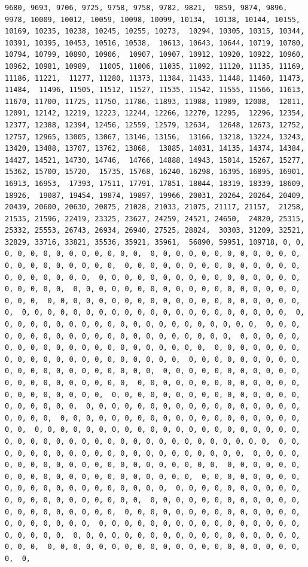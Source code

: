 \documentclass[
]{article}
\begin{document}
\begin{verbatim}
9680, 9693, 9706, 9725, 9758, 9758, 9782, 9821,  9859, 9874, 9896, 9978, 10009, 10012, 10059, 10098, 10099, 10134,  10138, 10144, 10155, 10169, 10235, 10238, 10245, 10255, 10273,  10294, 10305, 10315, 10344, 10391, 10395, 10453, 10516, 10538,  10613, 10643, 10644, 10719, 10780, 10794, 10799, 10890, 10906,  10907, 10907, 10912, 10920, 10922, 10960, 10962, 10981, 10989,  11005, 11006, 11035, 11092, 11120, 11135, 11169, 11186, 11221,  11277, 11280, 11373, 11384, 11433, 11448, 11460, 11473, 11484,  11496, 11505, 11512, 11527, 11535, 11542, 11555, 11566, 11613,  11670, 11700, 11725, 11750, 11786, 11893, 11988, 11989, 12008,  12011, 12091, 12142, 12219, 12223, 12244, 12266, 12270, 12295,  12296, 12354, 12377, 12388, 12394, 12456, 12559, 12579, 12634,  12648, 12673, 12752, 12757, 12965, 13005, 13067, 13146, 13156,  13166, 13218, 13224, 13243, 13420, 13488, 13707, 13762, 13868,  13885, 14031, 14135, 14374, 14384, 14427, 14521, 14730, 14746,  14766, 14888, 14943, 15014, 15267, 15277, 15362, 15700, 15720,  15735, 15768, 16240, 16298, 16395, 16895, 16901, 16913, 16953,  17393, 17511, 17791, 17851, 18044, 18319, 18339, 18609, 18926,  19087, 19454, 19874, 19897, 19966, 20031, 20264, 20264, 20409,  20439, 20600, 20630, 20875, 21028, 21033, 21075, 21117, 21157,  21258, 21535, 21596, 22419, 23325, 23627, 24259, 24521, 24650,  24820, 25315, 25332, 25553, 26743, 26934, 26940, 27525, 28824,  30303, 31209, 32521, 32829, 33716, 33821, 35536, 35921, 35961,  56890, 59951, 109718, 0, 0, 0, 0, 0, 0, 0, 0, 0, 0, 0, 0, 0,  0, 0, 0, 0, 0, 0, 0, 0, 0, 0, 0, 0, 0, 0, 0, 0, 0, 0, 0, 0, 0,  0, 0, 0, 0, 0, 0, 0, 0, 0, 0, 0, 0, 0, 0, 0, 0, 0, 0, 0, 0, 0,  0, 0, 0, 0, 0, 0, 0, 0, 0, 0, 0, 0, 0, 0, 0, 0, 0, 0, 0, 0, 0,  0, 0, 0, 0, 0, 0, 0, 0, 0, 0, 0, 0, 0, 0, 0, 0, 0, 0, 0, 0, 0,  0, 0, 0, 0, 0, 0, 0, 0, 0, 0, 0, 0, 0, 0, 0, 0, 0, 0, 0, 0, 0,  0, 0, 0, 0, 0, 0, 0, 0, 0, 0, 0, 0, 0, 0, 0, 0, 0, 0, 0, 0, 0,  0, 0, 0, 0, 0, 0, 0, 0, 0, 0, 0, 0, 0, 0, 0, 0, 0, 0, 0, 0, 0,  0, 0, 0, 0, 0, 0, 0, 0, 0, 0, 0, 0, 0, 0, 0, 0, 0, 0, 0, 0, 0,  0, 0, 0, 0, 0, 0, 0, 0, 0, 0, 0, 0, 0, 0, 0, 0, 0, 0, 0, 0, 0,  0, 0, 0, 0, 0, 0, 0, 0, 0, 0, 0, 0, 0, 0, 0, 0, 0, 0, 0, 0, 0,  0, 0, 0, 0, 0, 0, 0, 0, 0, 0, 0, 0, 0, 0, 0, 0, 0, 0, 0, 0, 0,  0, 0, 0, 0, 0, 0, 0, 0, 0, 0, 0, 0, 0, 0, 0, 0, 0, 0, 0, 0, 0,  0, 0, 0, 0, 0, 0, 0, 0, 0, 0, 0, 0, 0, 0, 0, 0, 0, 0, 0, 0, 0,  0, 0, 0, 0, 0, 0, 0, 0, 0, 0, 0, 0, 0, 0, 0, 0, 0, 0, 0, 0, 0,  0, 0, 0, 0, 0, 0, 0, 0, 0, 0, 0, 0, 0, 0, 0, 0, 0, 0, 0, 0, 0,  0, 0, 0, 0, 0, 0, 0, 0, 0, 0, 0, 0, 0, 0, 0, 0, 0, 0, 0, 0, 0,  0, 0, 0, 0, 0, 0, 0, 0, 0, 0, 0, 0, 0, 0, 0, 0, 0, 0, 0, 0, 0,  0, 0, 0, 0, 0, 0, 0, 0, 0, 0, 0, 0, 0, 0, 0, 0, 0, 0, 0, 0, 0,  0, 0, 0, 0, 0, 0, 0, 0, 0, 0, 0, 0, 0, 0, 0, 0, 0, 0, 0, 0, 0,  0, 0, 0, 0, 0, 0, 0, 0, 0, 0, 0, 0, 0, 0, 0, 0, 0, 0, 0, 0, 0,  0, 0, 0, 0, 0, 0, 0, 0, 0, 0, 0, 0, 0, 0, 0, 0, 0, 0, 0, 0, 0,  0, 0, 0, 0, 0, 0, 0, 0, 0, 0, 0, 0, 0, 0, 0, 0, 0, 0, 0, 0, 0,  0, 0, 0, 0, 0, 0, 0, 0, 0, 0, 0, 0, 0, 0, 0, 0, 0, 0, 0, 0, 0,  0, 0, 0, 0, 0, 0, 0, 0, 0, 0, 0, 0, 0, 0, 0, 0, 0, 0, 0, 0, 0,  0, 0, 0, 0, 0, 0, 0, 0, 0, 0, 0, 0, 0, 0, 0, 0, 0, 0, 0, 0, 0,  0, 0, 0, 0, 0, 0, 0, 0, 0, 0, 0, 0, 0, 0, 0, 0, 0, 0, 0, 0, 0,  0, 0, 0, 0, 0, 0, 0, 0, 0, 0, 0, 0, 0, 0, 0, 0, 0, 0, 0, 0, 0,  0, 0, 0, 0, 0, 0, 0, 0, 0, 0, 0, 0, 0, 0, 0, 0, 0, 0, 0, 0, 0,  0, 
\end{verbatim}
\end{document}
